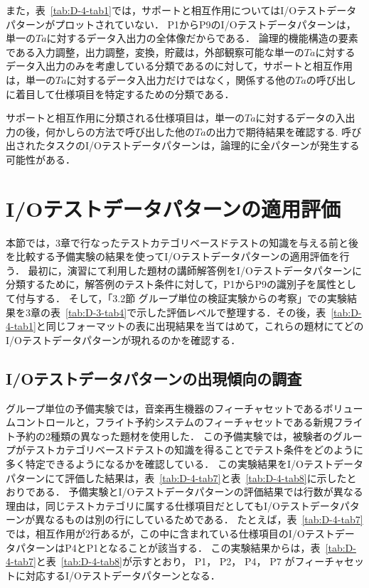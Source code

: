 また，表~\ref{tab:D-4-tab1}では，サポートと相互作用についてはI/Oテストデータパターンがプロットされていない．
P1からP9のI/Oテストデータパターンは，単一の$Ta$に対するデータ入出力の全体像だからである．
論理的機能構造の要素である入力調整，出力調整，変換，貯蔵は，外部観察可能な単一の$Ta$に対するデータ入出力のみを考慮している分類であるのに対して，サポートと相互作用は，単一の$Ta$に対するデータ入出力だけではなく，関係する他の$Ta$の呼び出しに着目して仕様項目を特定するための分類である．

サポートと相互作用に分類される仕様項目は，単一の$Ta$に対するデータの入出力の後，何かしらの方法で呼び出した他の$Ta$の出力で期待結果を確認する.
呼び出されたタスクのI/Oテストデータパターンは，論理的に全パターンが発生する可能性がある．


\newpage
\section{I/Oテストデータパターンの適用評価}
本節では，3章で行なったテストカテゴリベースドテストの知識を与える前と後を比較する予備実験の結果を使ってI/Oテストデータパターンの適用評価を行う．
最初に，演習にて利用した題材の講師解答例をI/Oテストデータパターンに分類するために，解答例のテスト条件に対して，P1からP9の識別子を属性として付与する．
そして，「3.2節 グループ単位の検証実験からの考察」での実験結果を3章の表~\ref{tab:D-3-tab4}で示した評価レベルで整理する．その後，表~\ref{tab:D-4-tab1}と同じフォーマットの表に出現結果を当てはめて，これらの題材にてどのI/Oテストデータパターンが現れるのかを確認する．

\subsection{I/Oテストデータパターンの出現傾向の調査}
グループ単位の予備実験では，音楽再生機器のフィーチャセットであるボリュームコントロールと，フライト予約システムのフィーチャセットである新規フライト予約の2種類の異なった題材を使用した．
この予備実験では，被験者のグループがテストカテゴリベースドテストの知識を得ることでテスト条件をどのように多く特定できるようになるかを確認している．
この実験結果をI/Oテストデータパターンにて評価した結果は，表~\ref{tab:D-4-tab7}と表~\ref{tab:D-4-tab8}に示したとおりである．
予備実験とI/Oテストデータパターンの評価結果では行数が異なる理由は，同じテストカテゴリに属する仕様項目だとしてもI/Oテストデータパターンが異なるものは別の行にしているためである．
たとえば，表~\ref{tab:D-4-tab7}では，相互作用が2行あるが，この中に含まれている仕様項目のI/OテストデータパターンはP4とP1となることが該当する．
この実験結果からは，表~\ref{tab:D-4-tab7}と表~\ref{tab:D-4-tab8}が示すとおり， P1， P2， P4， P7 がフィーチャセットに対応するI/Oテストデータパターンとなる．

